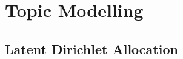 \chapter{Topic Modelling}
\label{cha:topic_modelling}

\section{Latent Dirichlet Allocation}
\label{sec:lda}


